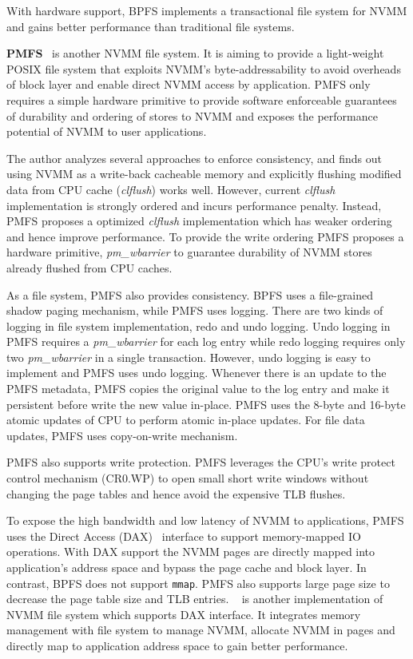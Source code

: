 With hardware support, BPFS implements a transactional file system for NVMM
and gains better performance than traditional file systems.


\textbf{PMFS}~\cite{PMFS} is another NVMM file system. It is aiming to
provide a
light-weight POSIX file system that exploits NVMM's byte-addressability to
avoid overheads of block layer and enable direct NVMM access by application.
PMFS only requires a simple hardware primitive to provide software enforceable
guarantees of durability and ordering of stores to NVMM and exposes the 
performance potential of NVMM to user applications.

The author analyzes several approaches to enforce consistency, and finds out
using NVMM as a write-back cacheable memory and explicitly flushing modified
data from CPU cache (\emph{clflush}) works well. However, current \emph{clflush}
implementation is strongly ordered and incurs performance penalty. Instead,
PMFS proposes a optimized \emph{clflush} implementation which has  weaker
 ordering
and hence improve performance. To provide the write ordering PMFS proposes
a hardware primitive, \emph{pm\_wbarrier} to guarantee durability of NVMM stores
already flushed from CPU caches.

As a file system, PMFS also provides consistency. BPFS uses a file-grained
shadow paging mechanism, while PMFS uses logging. There are two kinds of logging
in file system implementation, redo and undo logging. Undo logging in PMFS
requires a \emph{pm\_wbarrier} for each log entry while redo logging requires
only two \emph{pm\_wbarrier} in a single transaction. However, undo logging
is easy to implement and PMFS uses undo logging. Whenever there is an update
to the PMFS metadata, PMFS copies the original value to the log entry and
make it persistent before write the new value in-place. PMFS uses the
8-byte and 16-byte atomic updates of CPU to perform atomic in-place updates.
For file data updates, PMFS uses copy-on-write mechanism.

PMFS also supports write protection. PMFS leverages
the CPU's write protect control mechanism (CR0.WP) to open small short write
windows without changing the page tables and hence avoid the expensive
TLB flushes.

To expose the high bandwidth and low latency of NVMM to applications,
PMFS uses the Direct Access (DAX)~\cite{ext4dax} interface to support
memory-mapped
IO operations. With DAX support the NVMM pages are directly mapped into
application's address space and bypass the page cache and block layer.
In contrast, BPFS does not support \texttt{mmap}.
PMFS also supports large page size to decrease the page table size and
TLB entries. ~\cite{mmfs} is another implementation of NVMM file system
which supports DAX interface. It integrates memory management with file system
to manage NVMM, allocate NVMM in pages and directly map to application
address space to gain better performance.

